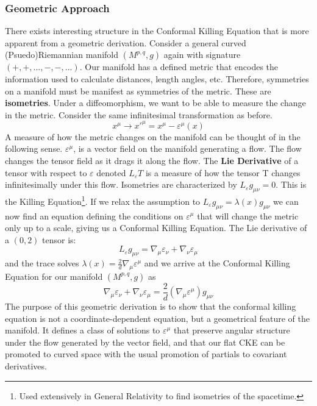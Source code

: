 \documentclass{article}
\begin{document}
\subsubsection{Geometric Approach}
There exists interesting structure in the Conformal Killing Equation that is more apparent from a geometric derivation. Consider a general curved (Psuedo)Riemannian manifold $(M^{p,q},g)$ again with signature $(+,+,...,-,-,...)$. Our manifold has a defined metric that encodes the information used to calculate distances, length angles, etc. Therefore, symmetries on a manifold must be manifest as symmetries of the metric. These are \textbf{isometries}. Under a diffeomorphism, we want to be able to measure the change in the metric. Consider the same infinitesimal transformation as before. 
\begin{equation}
    x^\mu \longrightarrow x'^\mu = x^\mu - \varepsilon^\mu(x)
\end{equation}
A measure of how the metric changes on the manifold can be thought of in the following sense. $\varepsilon^\mu$, is a vector field on the manifold generating a flow. The flow changes the tensor field as it drags it along the flow. The \textbf{Lie Derivative} of a tensor with respect to $\varepsilon$ denoted $L_\varepsilon T$ is a measure of how the tensor T changes infinitesimally under this flow. Isometries are characterized by $L_\varepsilon g_{\mu\nu} = 0$. This is the Killing Equation\footnote{Used extensively in General Relativity to find isometries of the spacetime.}. If we relax the assumption to $L_\varepsilon g_{\mu\nu} = \lambda(x)g_{\mu\nu}$ we can now find an equation defining the conditions on $\varepsilon^\mu$ that will change the metric only up to a scale, giving us a Conformal Killing Equation. The Lie derivative of a $(0,2)$ tensor is:
\begin{equation}
    L_\varepsilon g_{\mu\nu} = \nabla_\mu \varepsilon_\nu + \nabla_\nu\varepsilon_\mu
\end{equation}
and the trace solves $\lambda(x) = \frac{2 }{d}\nabla_\mu\varepsilon^\mu$ and we arrive at the Conformal Killing Equation for our manifold $(M^{p,q} , g)$ as 
\begin{equation}
    \boxed{\nabla_\mu \varepsilon_\nu + \nabla_\nu\varepsilon_\mu = \frac{2}{d}(\nabla_\mu\varepsilon^\mu)g_{\mu\nu}}
\end{equation}
The purpose of this geometric derivation is to show that the conformal killing equation is not a coordinate-dependent equation, but a geometrical feature of the manifold. It defines a class of solutions to $\varepsilon^\mu$ that preserve angular structure under the flow generated by the vector field, and that our flat CKE can be promoted to curved space with the usual promotion of partials to covariant derivatives. 
\end{document}
